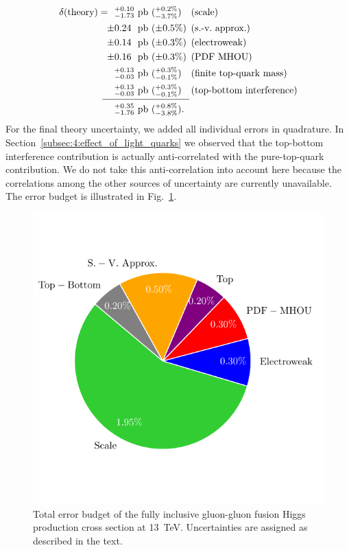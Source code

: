 \begin{equation}
\begin{alignedat}{5}
\delta(\text{theory}) =\ \  & {}^{+0.10}_{-1.73}\ &&\text{pb    }  && ({}_{-3.7\%}^{+0.2\%}) \quad  &&(\text{scale}) \\
\pm & 0.24\ &&\mathrm{pb}  && (\pm 0.5\%) &&(\text{s.-v.\ approx.}) \\
\pm & 0.14\ &&\mathrm{pb}  && (\pm 0.3\%) &&(\text{electroweak}) \\
\pm & 0.16\ &&\mathrm{pb} && (\pm 0.3\%) &&(\text{PDF MHOU}) \\
& {}^{+0.13}_{-0.03}\ &&\mathrm{pb}  && ({}_{-0.1\%}^{+0.3\%}) &&(\text{finite top-quark mass}) \\
& {}^{+0.13}_{-0.03}\ &&\mathrm{pb}  && ({}_{-0.1\%}^{+0.3\%}) &&(\text{top-bottom interference}) \\[-10pt]
& && \hspace{0.3cm} \mathclap{\rule{3.2cm}{0.4pt}}\\[-4pt]
& {}^{+0.35}_{-1.76}  \ &&\mathrm{pb} && ({}_{-3.8\%}^{+0.8\%}).
\end{alignedat}
\end{equation}
For the final theory uncertainty, we added all individual errors in quadrature. In Section~\ref{subsec:4:effect_of_light_quarks} we observed that the top-bottom interference contribution is actually anti-correlated with the pure-top-quark contribution. We do not take this anti-correlation into account here because the correlations among the other sources of uncertainty are currently unavailable. The error budget is illustrated in Fig.~\ref{fig:6:error_budget}.
\begin{figure}[ht]
\centering
\includegraphics[scale=0.8]{Images/error_budget_after.pdf}
\caption{Total error budget of the fully inclusive gluon-gluon fusion Higgs production cross section at 13~TeV. Uncertainties are assigned as described in the text.}
\label{fig:6:error_budget}
\end{figure}

